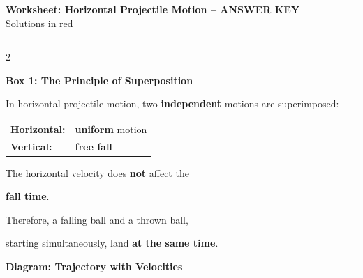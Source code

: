 \documentclass[10pt, a4paper]{article}
\newcommand{\fachfarbe}{physik}
\newcommand{\thema}{Horizontal Projectile Motion}
\newcommand{\lsg}[1]{\textcolor{loesung}{\textbf{#1}}}
\newcommand{\ph}[1]{\textcolor{\fachfarbe}{\textbf{#1}}}
\newcommand{\abschnitt}[1]{%
    \vspace{8pt}
    \noindent\textbf{\textcolor{\fachfarbe}{#1}}
    \vspace{4pt}
}
\begin{document}

\begin{center}
{\large\bfseries Worksheet: \thema{} -- \textcolor{loesung}{ANSWER KEY}}\\[2pt]
{\small\textcolor{grau}{Solutions in red}}
\end{center}

\vspace{-2pt}
\hrule
\vspace{8pt}


\begin{multicols}{2}
\small


\abschnitt{Box 1: The Principle of Superposition}

\begin{merksatz}
In horizontal projectile motion, two \ph{independent} motions are superimposed:

\vspace{6pt}
\begin{tabular}{ll}
\textbf{Horizontal:} & \lsg{uniform} motion \\[4pt]
\textbf{Vertical:} & \lsg{free fall} \\
\end{tabular}

\vspace{8pt}
The horizontal velocity does \textbf{not} affect the

\lsg{fall time}.

\vspace{6pt}
Therefore, a falling ball and a thrown ball,

starting simultaneously, land \lsg{at the same time}.
\end{merksatz}

\vspace{4pt}


\abschnitt{Diagram: Trajectory with Velocities}


\end{multicols}
\end{document}

